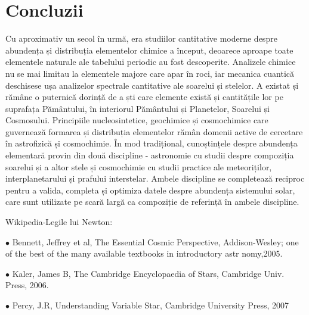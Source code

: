 \documentclass{article}
\begin{document}
\section{Concluzii}
Cu aproximativ un secol în urmă, era studiilor cantitative moderne despre abundența și distribuția elementelor chimice a început, deoarece aproape toate elementele naturale ale tabelului periodic au fost descoperite. Analizele chimice nu se mai limitau la elementele majore care apar în roci, iar mecanica cuantică deschisese ușa analizelor spectrale cantitative ale soarelui și stelelor. A existat și rămâne o puternică dorință de a ști care elemente există și cantitățile lor pe suprafața Pământului, în interiorul Pământului și Planetelor, Soarelui și Cosmosului. Principiile nucleosintetice, geochimice și cosmochimice care guvernează formarea și distribuția elementelor rămân domenii active de cercetare în astrofizică și cosmochimie. În mod tradițional, cunoștințele despre abundența elementară provin din două discipline - astronomie cu studii despre compoziția soarelui și a altor stele și cosmochimie cu studii practice ale meteoriților, interplanetarului și prafului interstelar. Ambele discipline se completează reciproc pentru a valida, completa și optimiza datele despre abundența sistemului solar, care sunt utilizate pe scară largă ca compoziție de referință în ambele discipline.
\begin{thebibliography}{a}
 Wikipedia-Legile lui Newton:

	$\bullet$ Bennett, Jeffrey et al, The Essential Cosmic Perspective, Addison-Wesley; one of the best of the many available textbooks in introductory astr nomy,2005.
	
	$\bullet$ Kaler, James B, The Cambridge Encyclopaedia of Stars, Cambridge Univ. Press, 2006.
	
	$\bullet$ Percy, J.R, Understanding Variable Star, Cambridge University Press, 2007

\end{thebibliography}
\end{document}
